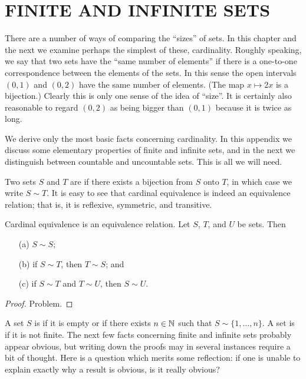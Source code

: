 \chapter{FINITE AND INFINITE SETS}

 \setcounter{section}{1}
 \setcounter{thm}{0}

There are a number of ways of comparing the ``sizes'' of sets. In this chapter and the next we
examine perhaps the simplest of these, cardinality.  Roughly speaking, we say that two sets
have the ``same number of elements'' if there is a one-to-one correspondence between the
elements of the sets. In this sense the open intervals $(0,1)$ and $(0,2)$ have the same
number of elements. (The map $x \mapsto 2x$ is a bijection.) Clearly this is only one sense of
the idea of ``size''. It is certainly also reasonable to regard $(0,2)$ as being bigger than
$(0,1)$ because it is twice as long.

We derive only the most basic facts concerning cardinality. In this appendix we discuss some
elementary properties of finite and infinite sets, and in the next we distinguish between
countable and uncountable sets. This is all we will need.

\begin{defn} Two sets $S$ and $T$ are
 if there exists a bijection from $S$ onto $T$, in which case we
write $S \sim T$. It is easy to see that cardinal equivalence is indeed an equivalence
relation; that is, it is reflexive, symmetric, and transitive.
\end{defn}

\begin{prop}\label{prop_ce_er} Cardinal equivalence is an equivalence relation.  Let $S$, $T$,
and $U$ be sets.  Then
 \begin{enumerate}
  \item[(a)] $S \sim S$;
  \item[(b)] if $S \sim T$, then $T \sim S$; and
  \item[(c)] if $S \sim T$ and $T \sim U$, then $S \sim U$.
 \end{enumerate}
\end{prop}

\begin{proof} Problem.  \ns  \end{proof}

\begin{defn} A set $S$ is
 if it is empty or if there exists $n \in \mathbb{N}$ such that $S \sim \{1,\dots,n\}$. A
set is
 if it is not finite. The next few facts concerning finite and infinite sets
probably appear obvious, but writing down the proofs may in several instances require a bit of
thought.  Here is a question which merits some reflection: if one is unable to explain exactly
why a result is obvious, is it really obvious?
\end{defn}

